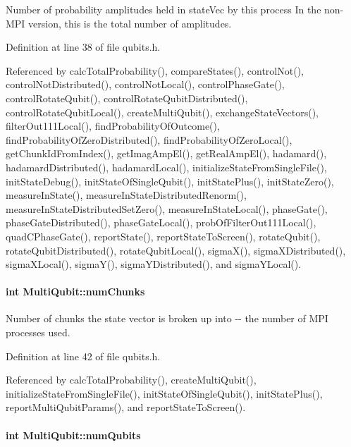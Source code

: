 Number of probability amplitudes held in stateVec by this process In the non-\/MPI version, this is the total number of amplitudes. 

Definition at line 38 of file qubits.h.

Referenced by calcTotalProbability(), compareStates(), controlNot(), controlNotDistributed(), controlNotLocal(), controlPhaseGate(), controlRotateQubit(), controlRotateQubitDistributed(), controlRotateQubitLocal(), createMultiQubit(), exchangeStateVectors(), filterOut111Local(), findProbabilityOfOutcome(), findProbabilityOfZeroDistributed(), findProbabilityOfZeroLocal(), getChunkIdFromIndex(), getImagAmpEl(), getRealAmpEl(), hadamard(), hadamardDistributed(), hadamardLocal(), initializeStateFromSingleFile(), initStateDebug(), initStateOfSingleQubit(), initStatePlus(), initStateZero(), measureInState(), measureInStateDistributedRenorm(), measureInStateDistributedSetZero(), measureInStateLocal(), phaseGate(), phaseGateDistributed(), phaseGateLocal(), probOfFilterOut111Local(), quadCPhaseGate(), reportState(), reportStateToScreen(), rotateQubit(), rotateQubitDistributed(), rotateQubitLocal(), sigmaX(), sigmaXDistributed(), sigmaXLocal(), sigmaY(), sigmaYDistributed(), and sigmaYLocal().\hypertarget{structMultiQubit_acd43f2f57991709c9e94f73662c972b2}{
\paragraph[{numChunks}]{\setlength{\rightskip}{0pt plus 5cm}int {\bf MultiQubit::numChunks}}\hfill}
\label{structMultiQubit_acd43f2f57991709c9e94f73662c972b2}


Number of chunks the state vector is broken up into -\/-\/ the number of MPI processes used. 

Definition at line 42 of file qubits.h.

Referenced by calcTotalProbability(), createMultiQubit(), initializeStateFromSingleFile(), initStateOfSingleQubit(), initStatePlus(), reportMultiQubitParams(), and reportStateToScreen().\hypertarget{structMultiQubit_ab5b9795bdc6fb5855e1974dcbbaeb36f}{
\paragraph[{numQubits}]{\setlength{\rightskip}{0pt plus 5cm}int {\bf MultiQubit::numQubits}}\hfill}
\label{structMultiQubit_ab5b9795bdc6fb5855e1974dcbbaeb36f}


